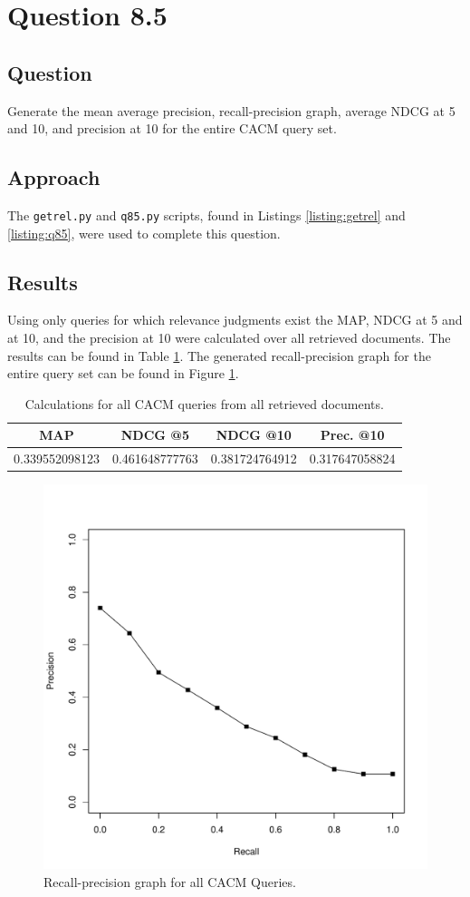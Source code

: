\section{Question 8.5}

\subsection{Question}
Generate the mean average precision, recall-precision graph, average NDCG at 5 and 10, and precision at 10 for the entire CACM query set.

\subsection{Approach}
The \texttt{getrel.py} and \texttt{q85.py} scripts, found in Listings \ref{listing:getrel} and \ref{listing:q85}, were used to complete this question.

\subsection{Results}
Using only queries for which relevance judgments exist the MAP, NDCG at 5 and at 10, and the precision at 10 were calculated over all retrieved documents.  The results can be found in Table \ref{tab:q85}. The generated recall-precision graph for the entire query set can be found in Figure \ref{fig:overallavg}.

\begin{table}[h!]
\centering
\begin{tabular}{ | c | c | c | c | }
\hline
MAP & NDCG @5 & NDCG @10 & Prec. @10 \\
\hline
0.339552098123 & 0.461648777763 & 0.381724764912 & 0.317647058824 \\
\hline
\end{tabular}
\caption{Calculations for all CACM queries from all retrieved documents.}
\label{tab:q85}
\end{table}

\begin{figure}[H]
\centering
\label{fig:overallavg}
\includegraphics[scale=.6]{code/getrel/avgq85.pdf}
\caption{Recall-precision graph for all CACM Queries.}
\end{figure}
